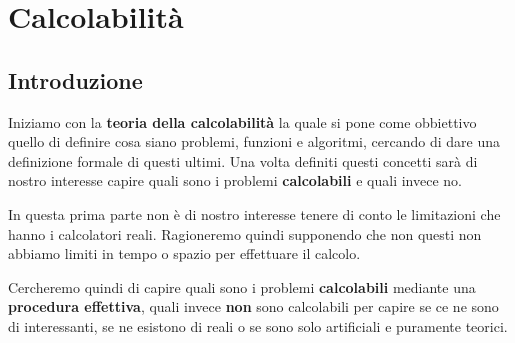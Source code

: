 \part{Calcolabilità}

\chapter{Introduzione}
Iniziamo con la \textbf{teoria della calcolabilità} la quale
si pone come obbiettivo quello di definire cosa siano problemi,
funzioni e algoritmi, cercando di dare una definizione formale
di questi ultimi. Una volta definiti questi concetti sarà di
nostro interesse capire quali sono i problemi
\textbf{calcolabili} e quali invece no.

In questa prima parte non è di nostro interesse tenere di conto
le limitazioni che hanno i calcolatori reali. Ragioneremo quindi
supponendo che non questi non abbiamo limiti in tempo o spazio
per effettuare il calcolo.

Cercheremo quindi di capire quali sono i problemi
\textbf{calcolabili} mediante una \textbf{procedura effettiva},
quali invece \textbf{non} sono calcolabili per capire se ce ne
sono di interessanti, se ne esistono di reali o se sono solo
artificiali e puramente teorici.
